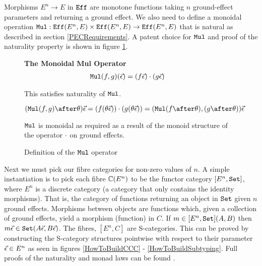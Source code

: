 \documentclass{Report}
\begin{document}
Morphisms $E^n \rightarrow E$ in $\Eff$ are monotone functions taking $n$ ground-effect parameters and returning a ground effect. We also need to define a monoidal operation $\Mul: \Eff(E^n, E) \times \Eff(E^n, E) \rightarrow \Eff(E^n, E)$ that is natural as described in section \ref{PECRequirements}. A patent choice for $\Mul$ and proof of the naturality property is shown in figure \ref{MulDefinition}.

\begin{figure}
    \centering
    \begin{framed}
        \centering\textbf{The Monoidal Mul Operator}
        \begin{align*}
            \Mul(f, g)(\ev) & = (f\ev)\dot(g\ev)
        \end{align*}
        
        This satisfies naturality of $\Mul$.
        
        \begin{equation*}
            (\Mul(f, g)\after \theta)\ev = (f(\theta\ev))\dot(g(\theta\ev)) = (\Mul(f\after\theta), (g\after\theta))\ev
        \end{equation*}

        $\Mul$ is monoidal as required as a result of the monoid structure of the operator $\dot$ on ground effects.
    \end{framed}
    
    \caption{Definition of the $\Mul$ operator}
    \label{MulDefinition}
\end{figure}

Next we must pick our fibre categories for non-zero values of $n$. A simple instantiation is to pick each fibre $\C(E^n)$ to be the functor category $[E^n, \set]$,  where $E^n$ is a discrete category (a category that only contains the identity morphisms). That is, the category of functions returning an object in $\set$ given $n$ ground effects. Morphisms between objects are functions which, given a collection of ground effects, yield a morphism (function) in $C$. If $m\in [E^n, \set](A, B)$ then $m\ev\in\set(A\ev, B\ev)$. The fibres, $[E^n, C]$ are S-categories. This can be proved by constructing the S-category structures pointwise with respect to their parameter $\ev \in E^n$ as seen in figures \ref{HowToBuildCCC} - \ref{HowToBuildSubtyping}. Full proofs of the naturality and monad laws can be found .
\end{document}
